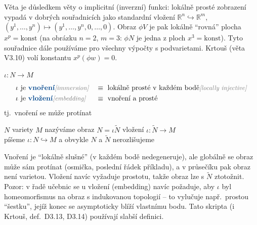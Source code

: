 \begin{vysvetleni}
Věta je důsledkem věty o implicitní (inverzní) funkci: lokálně prosté zobrazení vypadá v dobrých souřadnicích jako standardní vložení $\mathbb{R}^n\hookrightarrow\mathbb{R}^m$, $(y^1,\dots,y^n)\mapsto(y^1,\dots,y^n,0,\dots,0)$. Obraz $\phi V$ je pak lokálně ``rovná'' plocha $x^{p}=\text{konst}$ (na obrázku $n=2$, $m=3$: $\phi N$ je jedna z ploch $x^3=\text{konst}$). Tyto souřadnice dále používáme pro všechny výpočty s podvarietami. Krtouš (věta V3.10) volí konstantu $x^{p}(\phi w)=0$.
\end{vysvetleni}

\begin{definice}
$\iota: N\to M$
\begin{align*}
  &\iota \text{ je \kw{vnoření}} \pozn{immersion} && \equiv \text{ lokálně prosté v každém bodě} \pozn{locally injective} \\
  &\iota \text{ je \kw{vložení}} \pozn{embedding} && \equiv \text{ vnoření a prosté}
\end{align*}
tj.\ vnoření se může protínat
\end{definice}

\begin{definice}[podvarieta]
 $N$ variety $M$ nazýváme obraz $N = \iota\tilde N$ vložení $\iota: \tilde N\to M$ \\
píšeme $\iota: N\hookrightarrow M$ a obvykle $N$ a $\tilde N$ nerozlišujeme
\end{definice}

\begin{vysvetleni}
Vnoření je ``lokálně slušné'' (v každém bodě nedegeneruje), ale globálně se obraz může sám protínat (osmička, poslední řádek příkladu), a v průsečíku pak obraz není varietou. Vložení navíc vyžaduje prostotu, takže obraz lze s $\tilde N$ ztotožnit. Pozor: v řadě učebnic se u vložení (embedding) navíc požaduje, aby $\iota$ byl homeomorfismus na obraz s indukovanou topologií -- to vylučuje např.\ prostou ``šestku'', jejíž konec se asymptoticky blíží vlastnímu bodu. Tato skripta (i Krtouš, def.\ D3.13, D3.14) používají slabší definici.
\end{vysvetleni}


